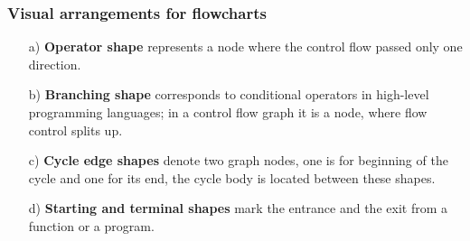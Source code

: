 \documentclass[aspectratio=169]{beamer}
\begin{document}
\begin{frame}
\frametitle{Visual arrangements for flowcharts}
\begin{enumerate}
\item [a)]\textbf{Operator shape} represents a node where the control flow passed only one direction.
\item [b)]\textbf{Branching shape} corresponds to conditional operators in high-level programming languages; in a control flow graph it is a node, where flow control splits up.
\item [c)]\textbf{Cycle edge shapes} denote two graph nodes, one is for beginning of the cycle and one for its end, the cycle body is located between these shapes.
\item [d)]\textbf{Starting and terminal shapes} mark the entrance and the exit from a function or a program.
	\end{enumerate}


\end{frame}
\end{document}
